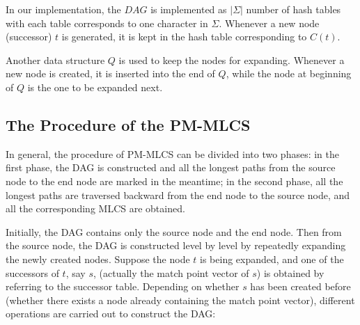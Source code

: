 \documentclass{article}
\begin{document}
In our implementation, the $DAG$ is implemented as $|\Sigma|$ number
of hash tables with each table corresponds to one character in
$\Sigma$.  Whenever a new node (successor) $t$ is generated, it is
kept in the hash table corresponding to $C(t)$.

Another data structure $Q$ is used to keep the nodes for expanding.
Whenever a new node is created, it is inserted into the end of $Q$,
while the node at beginning of $Q$ is the one to be expanded next.

\subsection{The Procedure of the PM-MLCS}
\label{sec:PM-MLCS}

In general, the procedure of PM-MLCS can be divided into two phases:
in the first phase, the DAG is constructed and all the longest paths
from the source node to the end node are marked in the meantime; in
the second phase, all the longest paths are traversed backward from
the end node to the source node, and all the corresponding MLCS are
obtained.

Initially, the DAG contains only the source node and the end node.
Then from the source node, the DAG is constructed level by level by
repeatedly expanding the newly created nodes. Suppose the node $t$ is
being expanded, and one of the successors of $t$, say $s$, (actually
the match point vector of $s$) is obtained by referring to the
successor table. Depending on whether $s$ has been created before
(whether there exists a node already containing the match point
vector), different operations are carried out to construct the DAG:
\end{document}
